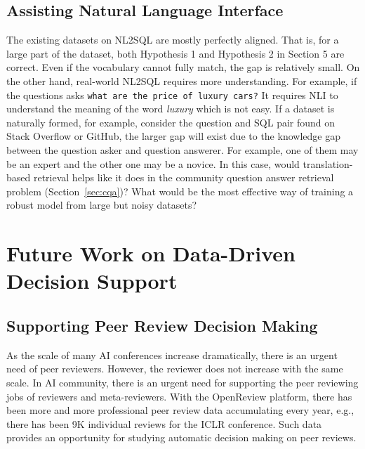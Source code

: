 \subsection{Assisting Natural Language Interface}

The existing datasets on NL2SQL are mostly perfectly aligned. That is, for a large part of the dataset, both Hypothesis 1 and Hypothesis 2 in Section 5 are correct. Even if the vocabulary cannot fully match, the gap is relatively small. On the other hand, real-world NL2SQL requires more understanding. For example, if the questions asks \texttt{what are the price of luxury cars?} It requires NLI to understand the meaning of the word \emph{luxury} which is not easy. If a dataset is naturally formed, for example, consider the question and SQL pair found on Stack Overflow or GitHub, the larger gap will exist due to the knowledge gap between the question asker and question answerer. For example, one of them may be an expert and the other one may be a novice. In this case, would translation-based retrieval helps like it does in the community question answer retrieval problem (Section~\ref{sec:cqa})? What would be the most effective way of training a robust model from large but noisy datasets? 

\section{Future Work on Data-Driven Decision Support}

\subsection{Supporting Peer Review Decision Making}

As the scale of many AI conferences increase dramatically, there is an urgent need of peer reviewers. However, the reviewer does not increase with the same scale. In AI community, there is an urgent need for supporting the peer reviewing jobs of reviewers and meta-reviewers. With the OpenReview platform, there has been more and more professional peer review data accumulating every year, e.g., there has been 9K individual reviews for the ICLR conference. Such data provides an opportunity for studying automatic decision making on peer reviews. 


